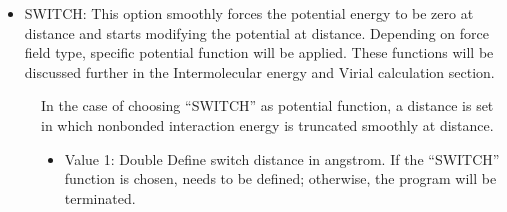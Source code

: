 \documentclass[letterpaper,10pt,english]{sphinxmanual}
\begin{document}
\begin{description}
\begin{itemize}
\begin{itemize}
\begin{sphinxVerbatim}[commandchars=\\\{\}]
\PYGZsh{}\PYGZsh{}\PYGZsh{}\PYGZsh{}\PYGZsh{}\PYGZsh{}\PYGZsh{}\PYGZsh{}\PYGZsh{}\PYGZsh{}\PYGZsh{}\PYGZsh{}\PYGZsh{}\PYGZsh{}\PYGZsh{}\PYGZsh{}\PYGZsh{}\PYGZsh{}\PYGZsh{}\PYGZsh{}\PYGZsh{}\PYGZsh{}\PYGZsh{}\PYGZsh{}\PYGZsh{}\PYGZsh{}\PYGZsh{}\PYGZsh{}\PYGZsh{}\PYGZsh{}\PYGZsh{}\PYGZsh{}\PYGZsh{}
\PYGZsh{} SIMULATION CONDITION
\PYGZsh{}\PYGZsh{}\PYGZsh{}\PYGZsh{}\PYGZsh{}\PYGZsh{}\PYGZsh{}\PYGZsh{}\PYGZsh{}\PYGZsh{}\PYGZsh{}\PYGZsh{}\PYGZsh{}\PYGZsh{}\PYGZsh{}\PYGZsh{}\PYGZsh{}\PYGZsh{}\PYGZsh{}\PYGZsh{}\PYGZsh{}\PYGZsh{}\PYGZsh{}\PYGZsh{}\PYGZsh{}\PYGZsh{}\PYGZsh{}\PYGZsh{}\PYGZsh{}\PYGZsh{}\PYGZsh{}\PYGZsh{}\PYGZsh{}
Temperature     270.00
Potential       SHIFT
LRC             false
Rcut            10
Exclude         1\PYGZhy{}4
RcutCoulomb  0  12.0
RcutCoulomb  1  20.0
\end{sphinxVerbatim}

\item {} 
SWITCH: This option smoothly forces the potential energy to be zero at  distance and starts modifying the potential at  distance. Depending on force field type, specific potential function will be applied. These functions will be discussed further in the Intermolecular energy and Virial calculation section.

\end{itemize}
\begin{description}
\item[{}] \leavevmode
In the case of choosing “SWITCH” as potential function, a distance is set in which non\sphinxhyphen{}bonded interaction energy is truncated smoothly at  distance.
\begin{itemize}
\item {} 
Value 1: Double \sphinxhyphen{} Define switch distance in angstrom. If the “SWITCH” function is chosen,  needs to be defined; otherwise, the program will be terminated.

\end{itemize}


\end{description}
\end{itemize}
\end{description}
\end{document}
